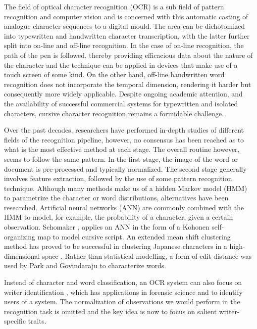 \documentclass[conference]{IEEEtran}
\begin{document}
The field of optical character recognition (OCR) is a sub field of pattern recognition and computer vision and is concerned with this automatic casting of analogue character sequences to a digital mould. The area can be dichotomized into typewritten and handwritten character transcription, with the latter further split into on-line and off-line recognition. In the case of on-line recognition, the path of the pen is followed, thereby providing efficacious data about the nature of the character and the technique can be applied in devices that make use of a touch screen of some kind. On the other hand, off-line handwritten word recognition does not incorporate the temporal dimension, rendering it harder but consequently more widely applicable. Despite ongoing academic attention, and the availability of successful commercial systems for typewritten and isolated characters, cursive character recognition remains a formidable challenge. 

Over the past decades, researchers have performed in-depth studies of different fields of the recognition pipeline, however, no consensus has been reached as to what is the most effective method at each stage. The overall routine however, seems to follow the same pattern. In the first stage, the image of the word or document is pre-processed and typically normalized. The second stage generally involves feature extraction, followed by the use of some pattern recognition technique. Although many methods make us of a hidden Markov model (HMM) \cite{journals/ijprai/MartiB01,journals/pr/BunkeRS95} to parametrize the character or word distributions, alternatives have been researched. Artificial neural networks (ANN) are commonly combined with the HMM \cite{journals/pami/GravesLFBBS09} to model, for example, the probability of a character, given a certain observation. Schomaker \cite{bb105728}, applies an ANN in the form of a Kohonen self-organizing map to model cursive script. An extended mean shift clustering method has proved to be successful in clustering Japanese characters in a high-dimensional space \cite{bb105468}. Rather than statistical modelling, a form of edit distance was used by Park and Govindaraju \cite{CVPR00_VOLII*290} to characterize words.

Instead of character and word classification, an OCR system can also focus on writer identification \cite{bb106176, oai:oai.columbia.edu:epic/nsdl/1/145780}, which has applications in forensic science and to identify users of a system. The normalization of observations we would perform in the recognition task is omitted and the key idea is now to focus on salient writer-specific traits.
\end{document}
